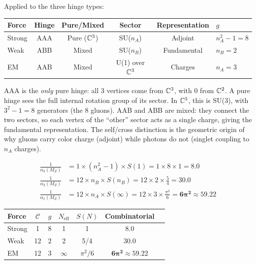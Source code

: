 Applied to the three hinge types:
\begin{center}
\begin{tabular}{lccccl}
\hline
Force & Hinge & Pure/Mixed & Sector & Representation & $g$ \\
\hline
Strong & AAA & Pure ($\mathbb{C}^3$) & SU($n_A$) & Adjoint & $n_A^2 - 1 = 8$ \\
Weak & ABB & Mixed & SU($n_B$) & Fundamental & $n_B = 2$ \\
EM & AAB & Mixed & U(1) over $\mathbb{C}^3$ & Charges & $n_A = 3$ \\
\hline
\end{tabular}
\end{center}

\begin{remark}
AAA is the \emph{only} pure hinge: all 3 vertices come from $\mathbb{C}^3$, with 0 from $\mathbb{C}^2$. A pure hinge sees the full internal rotation group of its sector. In $\mathbb{C}^3$, this is SU(3), with $3^2 - 1 = 8$ generators (the 8 gluons). AAB and ABB are mixed: they connect the two sectors, so each vertex of the ``other'' sector acts as a single charge, giving the fundamental representation. The self/cross distinction is the geometric origin of why gluons carry color charge (adjoint) while photons do not (singlet coupling to $n_A$ charges).
\end{remark}

\begin{theorem}
\label{thm:couplings}
\begin{align}
\frac{1}{\alpha_3(M_Z)} &= 1 \times (n_A^2 - 1) \times S(1) = 1 \times 8 \times 1 = \mathbf{8.0} \label{eq:alpha3} \\
\frac{1}{\alpha_2(M_Z)} &= 12 \times n_B \times S(n_B) = 12 \times 2 \times \frac{5}{4} = \mathbf{30.0} \label{eq:alpha2} \\
\frac{1}{\alpha_1(M_Z)} &= 12 \times n_A \times S(\infty) = 12 \times 3 \times \frac{\pi^2}{6} = \mathbf{6\pi^2} \approx 59.22 \label{eq:alpha1}
\end{align}
\end{theorem}

\begin{center}
\begin{tabular}{lcccccc}
\hline
Force & $\mathcal{C}$ & $g$ & $N_\text{eff}$ & $S(N)$ & Combinatorial \\
\hline
Strong & 1 & 8 & 1 & 1 & $\mathbf{8.0}$ \\
Weak & 12 & 2 & 2 & 5/4 & $\mathbf{30.0}$ \\
EM & 12 & 3 & $\infty$ & $\pi^2/6$ & $\mathbf{6\pi^2} \approx 59.22$ \\
\hline
\end{tabular}
\end{center}

